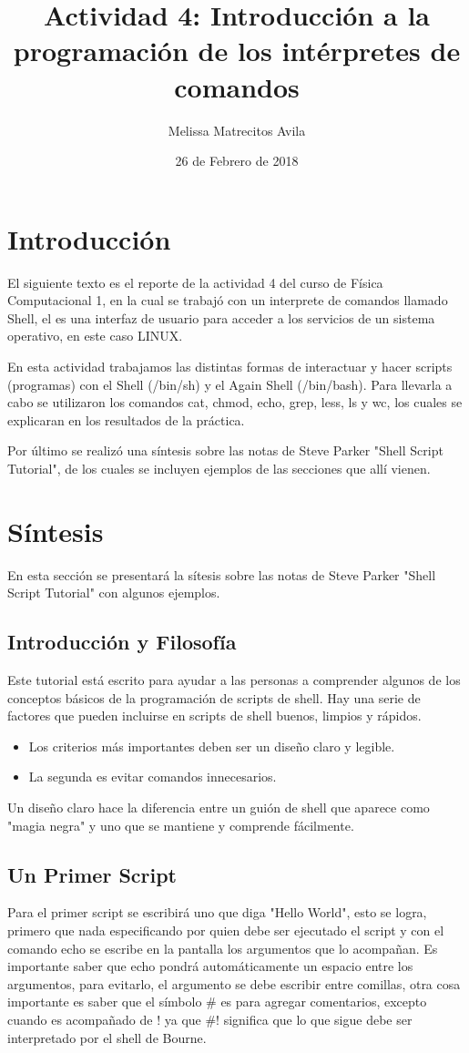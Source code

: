 \documentclass{article}
\title{Actividad 4: Introducción a la programación de los intérpretes de comandos}
\author{Melissa Matrecitos Avila}
\date{26 de Febrero de 2018}
\begin{document}
\maketitle

\section{Introducción}
El siguiente texto es el reporte de la actividad 4 del curso de Física Computacional 1, en la cual se trabajó con un interprete de comandos llamado Shell, el es una interfaz de usuario para acceder a los servicios de un sistema operativo, en este caso LINUX.

En esta actividad trabajamos las distintas formas de interactuar y hacer scripts (programas) con el Shell (/bin/sh) y el  Again Shell (/bin/bash). Para llevarla a cabo se utilizaron los comandos cat, chmod, echo, grep, less, ls y wc, los cuales se explicaran en los resultados de la práctica.

Por último se realizó una síntesis sobre las notas de Steve Parker "Shell Script Tutorial", de los cuales se incluyen ejemplos de las secciones que allí vienen.

\section{Síntesis}
En esta sección se presentará la sítesis sobre las notas de Steve Parker "Shell Script Tutorial" con algunos ejemplos.
\subsection{Introducción y Filosofía}
Este tutorial está escrito para ayudar a las personas a comprender algunos de los conceptos básicos de la programación de scripts de shell.
Hay una serie de factores que pueden incluirse en scripts de shell buenos, limpios y rápidos.
\begin{itemize}
\item Los criterios más importantes deben ser un diseño claro y legible.
\item La segunda es evitar comandos innecesarios.
\end{itemize}
Un diseño claro hace la diferencia entre un guión de shell que aparece como "magia negra" y uno que se mantiene y comprende fácilmente.
\subsection{Un Primer Script}
Para el primer script se escribirá uno que diga "Hello World", esto se logra, primero que nada especificando por quien debe ser ejecutado el script y con el comando echo se escribe en la pantalla los argumentos que lo acompañan. Es importante saber que echo pondrá automáticamente un espacio entre los argumentos, para evitarlo, el argumento se debe escribir entre comillas, otra cosa importante es saber que el símbolo  \# es para agregar comentarios, excepto cuando es acompañado de ! ya que \#! significa que lo que sigue debe ser interpretado por el shell de Bourne.
\end{document}
